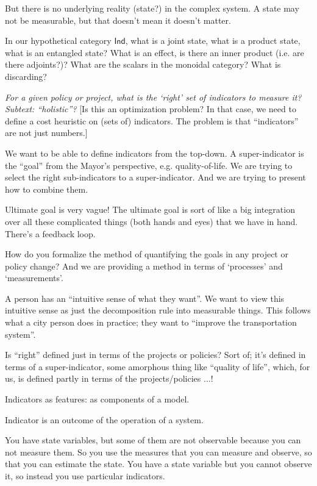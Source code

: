 \documentclass{sig-alternate-05-2015}
\theoremstyle{plain}
\theoremstyle{plain}
\theoremstyle{remark}
\newcommand{\Cat}[1]{\mathsf{#1}}
\def\Ind{\Cat{Ind}}
\begin{document}
But there is no underlying reality (state?) in the complex system. A state may not be measurable, but that doesn't mean it doesn't matter.

In our hypothetical category $\Ind$, what is a joint state, what is a product state, what is an entangled state? What is an effect, is there an inner product (i.e. are there adjoints?)? What are the scalars in the monoidal category? What is discarding?

\emph{For a given policy or project, what is the `right' set of indicators to measure it? Subtext: ``holistic''?} [Is this an optimization problem? In that case, we need to define a cost heuristic on (sets of) indicators. The problem is that ``indicators'' are not just numbers.]

We want to be able to define indicators from the top-down. A super-indicator is the ``goal'' from the Mayor's perspective, e.g. quality-of-life. We are trying to select the right sub-indicators to a super-indicator. And we are trying to present how to combine them.

Ultimate goal is very vague! The ultimate goal is sort of like a big integration over all these complicated things (both hands and eyes) that we have in hand. There's a feedback loop.

How do you formalize the method of quantifying the goals in any project or policy change? And we are providing a method in terms of `processes' and `measurements'.

A person has an ``intuitive sense of what they want''. We want to view this intuitive sense as just the decomposition rule into measurable things. This follows what a city person does in practice; they want to ``improve the transportation system''.

Is ``right'' defined just in terms of the projects or policies? Sort of; it's defined in terms of a super-indicator, some amorphous thing like ``quality of life'', which, for us, is defined partly in terms of the projects/policies ...!

Indicators as features: as components of a model.

Indicator is an outcome of the operation of a system.

You have state variables, but some of them are not observable because you can not measure them. So you use the measures that you can measure and observe, so that you can estimate the state. You have a state variable but you cannot observe it, so instead you use particular indicators.
\end{document}
